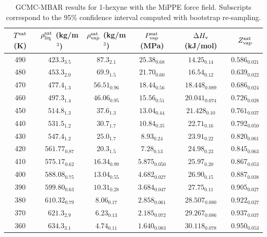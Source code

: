 \documentclass[journal=jctc,manuscript=article]{achemso}
\begin{document}
\begin{table}[htb!]
	\caption{GCMC-MBAR results for 1-hexyne with the MiPPE force field. Subscripts correspond to the 95\% confidence interval computed with bootstrap re-sampling.}
	\begin{center}
		\begin{tabular}{|c|c|c|c|c|c|}
			\hline
			$T^{\rm sat}$ (K) & $\rho_{\rm liq}^{\rm sat}$ (kg/m$^3$) & $\rho_{\rm vap}^{\rm sat}$ (kg/m$^3$) & $P_{\rm vap}^{\rm sat}$ (MPa) & $\Delta H_{\rm v}$ (kJ/mol) & $Z_{\rm vap}^{\rm sat}$ \\ \hline
			490 & $423.3_{3.5}$ & $87.3_{2.1}$ & $25.38_{0.68}$ & $14.25_{0.14}$ & $0.586_{0.021}$ \\
			480 & $453.3_{2.0}$ & $69.9_{1.5}$ & $21.70_{0.60}$ & $16.54_{0.12}$ & $0.639_{0.022}$ \\
			470 & $477.4_{1.3}$ & $56.51_{0.96}$ & $18.44_{0.56}$ & $18.448_{0.089}$ & $0.686_{0.024}$ \\
			460 & $497.3_{1.4}$ & $46.06_{0.95}$ & $15.56_{0.51}$ & $20.041_{0.074}$ & $0.726_{0.028}$ \\
			450 & $514.8_{1.3}$ & $37.6_{1.3}$ & $13.04_{0.44}$ & $21.428_{0.10}$ & $0.761_{0.037}$ \\
			440 & $531.5_{1.2}$ & $30.7_{1.7}$ & $10.84_{0.35}$ & $22.71_{0.16}$ & $0.792_{0.050}$ \\
			430 & $547.4_{1.2}$ & $25.0_{1.7}$ & $8.93_{0.24}$ & $23.91_{0.22}$ & $0.820_{0.061}$ \\
			420 & $561.77_{0.87}$ & $20.3_{1.5}$ & $7.28_{0.13}$ & $24.98_{0.23}$ & $0.845_{0.063}$ \\
			410 & $575.17_{0.62}$ & $16.34_{0.99}$ & $5.875_{0.050}$ & $25.97_{0.20}$ & $0.867_{0.053}$ \\
			400 & $588.08_{0.75}$ & $13.04_{0.55}$ & $4.682_{0.027}$ & $26.90_{0.15}$ & $0.887_{0.038}$ \\
			390 & $599.80_{0.63}$ & $10.31_{0.28}$ & $3.684_{0.047}$ & $27.75_{0.11}$ & $0.905_{0.027}$ \\
			380 & $610.32_{0.79}$ & $8.06_{0.17}$ & $2.858_{0.061}$ & $28.507_{0.080}$ & $0.922_{0.027}$ \\
			370 & $621.3_{2.9}$ & $6.23_{0.13}$ & $2.185_{0.072}$ & $29.267_{0.086}$ & $0.937_{0.037}$ \\
			360 & $634.3_{3.1}$ & $4.74_{0.11}$ & $1.640_{0.083}$ & $30.118_{0.078}$ & $0.950_{0.053}$ \\
			\hline
		\end{tabular}
	\end{center}
\end{table}
\end{document}
